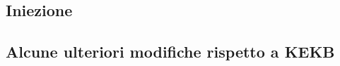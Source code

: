 \begin{comment}
In figura \ref{fig:beampar} si riportano i parametri di macchina (default) dell'acceleratore SuperKEKB.

\begin{equation}
\texttt{[image: beam\_par]}
\caption{Parametri di macchina di SuperKEKB. Il simbolo ''*'' indica i valori nel PI.}
\label{fig:beampar}
\end{equation}


\end{comment}


\begin{comment}
\subsection{Cromaticità e correzioni ottiche}
\end{comment}

\subsection{Iniezione}

\subsection{Alcune ulteriori modifiche rispetto a KEKB}

\begin{comment}

L'upgrade da KEKB a SuperKEKB, come in parte visto, ha richiesto importanti cambiamenti nei fasci e nello schema di collisione, tutto volto a raggiungere nuove vette di luimnosità. Altre fondamentali modifiche sono state fatte lungo l'anello di collisione, tra cui:

\begin{item}
\item rifacimento della regione d'interazione, che comprende 4 m intorno al PI, in modo da poter ospitare il nuovo detector Belle II, il sistema di focusing finale dei fasci e le due beam pipes;
\item il sistema a radiofrequenza è stato modificato per permettere una corrente maggiore dei fasci;
\item l'aggiunta di alcuni collimatori lungo entrambi gli anelli (11 nel LER  e 20 nel HER) per poter limitare il danno da radiazione sul rivelatore e i ''quenches'' dei magneti superconduttori, cioè un surriscaldamento dei suoi avvolgimenti che genericamente causa la perdità della superconduttività, dissipando la corrente circolante.
\item anche il sistema di vuoto è stato migliorato per limitare alcuni effetti collegati alla perdita di potenza del fascio, allungando quindi la vita media del fascio stesso.
\end{item}

\end{comment}


